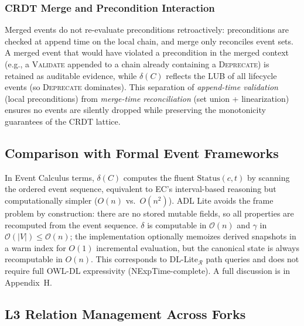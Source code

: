 \subsubsection{CRDT Merge and Precondition Interaction}

Merged events do not re-evaluate preconditions retroactively: preconditions are checked at append time on the local chain, and merge only reconciles event sets. A merged event that would have violated a precondition in the merged context (e.g., a \textsc{Validate} appended to a chain already containing a \textsc{Deprecate}) is retained as auditable evidence, while $\delta(C)$ reflects the LUB of all lifecycle events (so \textsc{Deprecate} dominates). This separation of \emph{append-time validation} (local preconditions) from \emph{merge-time reconciliation} (set union + linearization) ensures no events are silently dropped while preserving the monotonicity guarantees of the CRDT lattice.

\subsection{Comparison with Formal Event Frameworks}\label{subsec:event-frameworks}

In Event Calculus terms, $\delta(C)$ computes the fluent $\text{Status}(c, t)$ by scanning the ordered event sequence, equivalent to EC's interval-based reasoning but computationally simpler ($O(n)$ vs.~$O(n^2)$). ADL Lite avoids the frame problem by construction: there are no stored mutable fields, so all properties are recomputed from the event sequence. $\delta$ is computable in $\mathcal{O}(n)$ and $\gamma$ in $\mathcal{O}(|V|) \leq \mathcal{O}(n)$; the implementation optionally memoizes derived snapshots in a warm index for $O(1)$ incremental evaluation, but the canonical state is always recomputable in $O(n)$. This corresponds to DL-Lite$_{\mathcal{R}}$ path queries and does not require full OWL-DL expressivity (NExpTime-complete). A full discussion is in Appendix~H.

\subsection{L3 Relation Management Across Forks}\label{subsec:l3-fork-governance}

